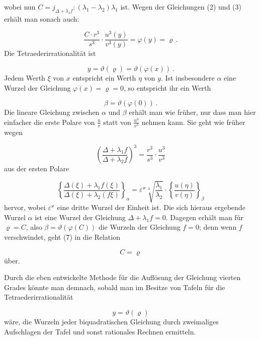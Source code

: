 
wobei nun $C = j_{\Delta+\lambda_1 f}:(\lambda_1-\lambda_2)\lambda_1$ ist. Wegen der Gleichungen (2) und (3) erhält man sonach auch:

\[
\frac{C\cdot r^3}{s^3}\cdot\frac{u^3(y)}{v^3(y)} = \varphi(y) = \varrho\,.
\]
Die Tetraederirrationalität ist

\[
y = \vartheta(\varrho) = \vartheta(\varphi(x))\,.
\]
Jedem Werth $\xi$ von $x$ entspricht ein Werth $\eta$ von $y$. Ist insbesondere $\alpha$ eine Wurzel der Gleichung $\varphi(x)=\varrho=0$, so entspricht ihr ein Werth

\[
\beta = \vartheta(\varphi(0))\,.
\]
Die lineare Gleichung zwischen $\alpha$ und $\beta$ erhält man wie früher, nur dass man hier einfacher die erste Polare von $\frac{u}{v}$ statt von $\frac{u^3}{v^3}$ nehmen kann. Sie geht wie früher wegen

\[
\left(\frac{\Delta+\lambda_1 f}{\Delta+\lambda_2 f}\right)^3 = \frac{r^3}{s^3}\cdot\frac{u^3}{v^3}
\]
aus der ersten Polare

\[
\left\{\frac{\Delta(\xi)+\lambda_1 f(\xi)}{\Delta(\xi)+\lambda_2(f\xi)}\right\}_\alpha = \varepsilon^\varkappa\sqrt[3]{\frac{\lambda_1}{\lambda_2}}\cdot\left\{\frac{u(\eta)}{v(\eta)}\right\}_\beta
\]
hervor, wobei $\varepsilon^\varkappa$ eine dritte Wurzel der Einheit ist. Die sich hieraus ergebende Wurzel $\alpha$ ist eine Wurzel der Gleichung $\Delta+\lambda_1 f=0$. Dagegen erhält man für $\varrho=C$, also $\beta=\vartheta(\varphi(C))$ die Wurzeln der Gleichung $f=0$; denn wenn $f$ verschwindet, geht (7) in die Relation

\[
C=\varrho
\]
über.



Durch die eben entwickelte Methode für die Auflösung der Gleichung vierten Grades könnte man demnach, sobald man im Besitze von Tafeln für die Tetraederirrationalität

\[
y = \vartheta(\varrho)
\]
wäre, die Wurzeln jeder biquadratischen Gleichung durch zweimaliges Aufschlagen der Tafel und sonst rationales Rechnen ermitteln.



